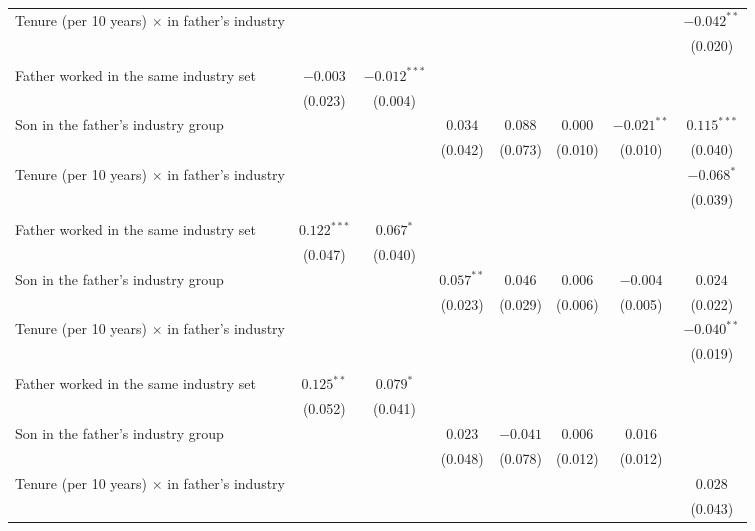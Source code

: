 \begin{table}[!htbp]
{{\begin{tabular}{lccccccc}
Tenure (per 10 years) $\times$ in father's industry &  &  &  &  &  &  & $-0.042^{**}$ \\
 &  &  &  &  &  &  & (0.020) \\
\addlinespace
\multicolumn{8}{l}{\textit{Black}} \\
Father worked in the same industry set & $-0.003$ & $-0.012^{***}$ &  &  &  &  &  \\
 & (0.023) & (0.004) &  &  &  &  &  \\
Son in the father's industry group &  &  & $0.034$ & $0.088$ & $0.000$ & $-0.021^{**}$ & $0.115^{***}$ \\
 &  &  & (0.042) & (0.073) & (0.010) & (0.010) & (0.040) \\
Tenure (per 10 years) $\times$ in father's industry &  &  &  &  &  &  & $-0.068^{*}$ \\
 &  &  &  &  &  &  & (0.039) \\
\addlinespace
\multicolumn{8}{l}{\textit{White}} \\
Father worked in the same industry set & $0.122^{***}$ & $0.067^{*}$ &  &  &  &  &  \\
 & (0.047) & (0.040) &  &  &  &  &  \\
Son in the father's industry group &  &  & $0.057^{**}$ & $0.046$ & $0.006$ & $-0.004$ & $0.024$ \\
 &  &  & (0.023) & (0.029) & (0.006) & (0.005) & (0.022) \\
Tenure (per 10 years) $\times$ in father's industry &  &  &  &  &  &  & $-0.040^{**}$ \\
 &  &  &  &  &  &  & (0.019) \\
\addlinespace
\multicolumn{8}{l}{\textit{White $-$ Black}} \\
Father worked in the same industry set & $0.125^{**}$ & $0.079^{*}$ &  &  &  &  &  \\
 & (0.052) & (0.041) &  &  &  &  &  \\
Son in the father's industry group &  &  & $0.023$ & $-0.041$ & $0.006$ & $0.016$ &  \\
 &  &  & (0.048) & (0.078) & (0.012) & (0.012) &  \\
Tenure (per 10 years) $\times$ in father's industry &  &  &  &  &  &  & $0.028$ \\
 &  &  &  &  &  &  & (0.043) \\
\bottomrule
\end{tabular}}}
\par\smallskip

\end{table}

